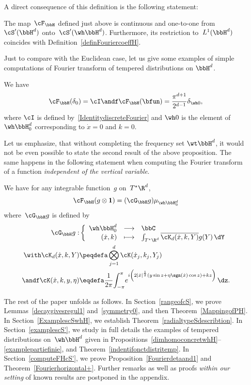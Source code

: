 A direct consequence of this definition is the following statement:

\begin{prop}\label{FS'Hconitnuous}
The map~$\cF_{\bbH}$ defined just above is continuous and one-to-one from~$\cS'(\bbH^d)$ onto~$\cS'(\wh\bbH^d)$. Furthermore, its restriction to~$L^1(\bbH^d)$ coincides with Definition~\ref{definFouriercoeffH}.
\end{prop}

Just to compare with the Euclidean case, let us give some examples of simple computations of Fourier transform of tempered distributions on $\bbH^d$.

\begin{prop}\label{Fourierdetaand1}
We have
\[
\cF_\bbH (\delta_0) = \cI\andf \cF_\bbH(\bfun) = \frac {\pi^{d+1}} { 2^{d-1}} \delta_{\wh 0},
\]
where $\cI$ is defined by~\eqref{IdentitydiscreteFourier} and $\wh 0$ is the element of $\wh \bbH^d_0$ corresponding to $\dot x=0$ and $k=0$.
\end{prop}

Let us emphasize, that without completing the frequency set $\wt\bbH^d$, it would not be even possible to state the second result of the above proposition. The same happens in the following statement when computing the Fourier transform of a function \emph{independent of the vertical variable}.

\begin{theo}\label{Fourierhorizontal+}
We have for any integrable function~$g$ on~$T^\star\R^d$,
\[
\cF_\bbH(g\otimes {\bf1}) = (\cG_\bbH g) \mu_{\wh \bbH^d_0}
\]
where~$\cG_\bbH g $ is defined by
\begin{align*}
\cG_\bbH g: &\left\{
\begin{array} {rcl}
\wh \bbH^d_0 & \longrightarrow & \bbC\\
(\dot x, k) & \longmapsto & \int_{T^\star \R^d} \overline{\cK_d(\dot x,k,Y)} g(Y)\, \dY
\end{array}
\right. \\ \with
\cK_d (\dot x, k,Y) & \peqdefa \bigotimes_{j=1}^d \cK (\dot x_j, k_j,Y_j)\\ \andf
\cK(\dot x, k,y,\eta) &\eqdefa \frac1{2\pi} \!\int_{-\pi}^{\pi} \! e^{i \left(2|\dot x|^{\frac 12} (y\sin z + \eta \sgn(\dot x) \cos z) +kz\right)}\, \dz.
\end{align*}
\end{theo}

The rest of the paper unfolds as follows. In Section~\ref{rangeofcS}, we prove Lemmas~\ref{decaygivesregul1} and~\ref{symmetry0}, and then Theorem~\ref{MappingofPH}. In Section~\ref{ExamplescSwhH}, we establish Theorem~\ref{radialtypeSdescribtion}. In Section~\ref{examplescS'}, we study in full details the examples of tempered distributions on~$\wh\bbH^d$ given in Propositions~\ref{dimhomoconcretwhH}--\ref{examplepartiefinie}, and Theorem~\ref{indentifonctdistritemp}. In Section~\ref{computeFHcS'}, we prove Proposition~\ref{Fourierdetaand1} and Theorem~\ref{Fourierhorizontal+}. Further remarks as well as proofs \emph{within our setting} of known results are postponed in the appendix.



